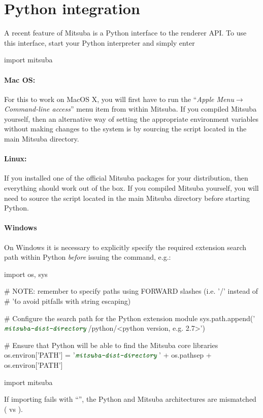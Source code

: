 \section{Python integration}
\label{sec:python}
A recent feature of Mitsuba is a Python interface to the renderer API.
To use this interface, start your Python interpreter and simply enter
\begin{python}
import mitsuba
\end{python}
\paragraph{Mac OS:}
For this to work on MacOS X, you will first have to run the ``\emph{Apple
Menu}$\to$\emph{Command-line access}'' menu item from within Mitsuba.
If you compiled Mitsuba yourself, then an alternative way of setting the appropriate
environment variables without making changes to the system is by sourcing the
 script located in the main Mitsuba directory.

\paragraph{Linux:}
If you installed one of the official Mitsuba packages for your distribution, then everything should work out of the box.
If you compiled Mitsuba yourself, you will need to source the
 script located in the main Mitsuba directory before starting Python.

\paragraph{Windows}
On Windows it is necessary to explicitly specify the required extension search path within Python
\emph{before} issuing the  command, e.g.:
\begin{python}
import os, sys

# NOTE: remember to specify paths using FORWARD slashes (i.e. '/' instead of
# '\' to avoid pitfalls with string escaping)

# Configure the search path for the Python extension module
sys.path.append('$\texttt{\color{lstattrib}\emph{mitsuba-dist-directory}}$/python/<python version, e.g. 2.7>')

# Ensure that Python will be able to find the Mitsuba core libraries
os.environ['PATH'] = '$\texttt{\color{lstattrib}\emph{mitsuba-dist-directory}}$' + os.pathsep + os.environ['PATH']

import mitsuba
\end{python}
\begin{sloppypar}
\noindent
If importing fails with ``'',
the Python and Mitsuba architectures are mismatched ( vs ).
\end{sloppypar}

